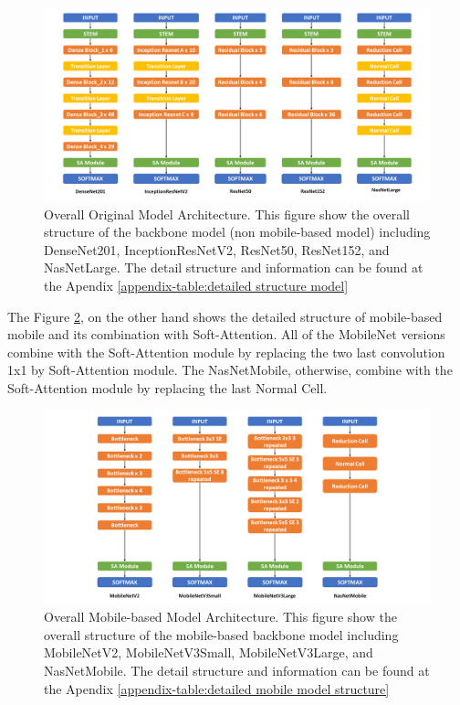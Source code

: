\documentclass[sensors,article,submit,pdftex,moreauthors]{Definitions/mdpi}
\begin{document}
\begin{figure}[H]
	\centering
	\includegraphics[width=1\linewidth]{Definitions/Model Structure}
	\caption{Overall Original Model Architecture. This figure show the overall structure of the backbone model (non mobile-based model) including DenseNet201, InceptionResNetV2, ResNet50, ResNet152, and NasNetLarge. The detail structure and information can be found at the Apendix \ref{appendix-table:detailed structure model}}
	\label{fig:model-structure}
\end{figure}

The Figure \ref{fig:mobile-model-structure}, on the other hand shows the detailed structure of mobile-based mobile and its combination with Soft-Attention. All of the MobileNet versions combine with the Soft-Attention module by replacing the two last convolution 1x1 by Soft-Attention module. The NasNetMobile, otherwise, combine with the Soft-Attention module by replacing the last Normal Cell. 
\begin{figure}[H]
	\centering
	\includegraphics[width=1\linewidth]{Definitions/Mobile Model Structure}
	\caption{Overall Mobile-based Model Architecture. This figure show the overall structure of the mobile-based backbone model including MobileNetV2, MobileNetV3Small, MobileNetV3Large, and NasNetMobile. The detail structure and information can be found at the Apendix \ref{appendix-table:detailed mobile model structure}}
	\label{fig:mobile-model-structure}
\end{figure}
\end{document}
